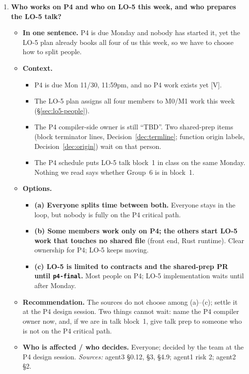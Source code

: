 \documentclass[10pt]{article}
\newcommand{\code}[1]{\texttt{\small #1}}
\newcommand{\mV}{\textsf{\scriptsize[V]}}
\newcommand{\field}[1]{\textbf{#1}\enspace}
\newcommand{\decitem}[1]{\needspace{6\baselineskip}\setcounter{enumi}{\numexpr#1-1\relax}\item}
\begin{document}
\begin{enumerate}[label=\textbf{\arabic*.},ref=\arabic*,leftmargin=1.8em,itemsep=0.8em]

\decitem{3}\label{dec:staffing}\textbf{Who works on P4 and who on LO-5 this week, and who prepares the LO-5 talk?}
\begin{itemize}
\item[] \field{In one sentence.} P4 is due Monday and nobody has started it, yet the LO-5 plan already books all four of us this week, so we have to choose how to split people.
\item[] \field{Context.}
\begin{itemize}
\item P4 is due Mon 11/30, 11:59pm, and no P4 work exists yet \mV.
\item The LO-5 plan assigns all four members to M0/M1 work this week (\S\ref{sec:lo5-people}).
\item The P4 compiler-side owner is still ``TBD''. Two shared-prep items (block terminator lines, Decision~\ref{dec:termline}; function origin labels, Decision~\ref{dec:origin}) wait on that person.
\item The P4 schedule puts LO-5 talk block~1 in class on the same Monday. Nothing we read says whether Group~6 is in block~1.
\end{itemize}
\item[] \field{Options.}
\begin{itemize}
\item \textbf{(a) Everyone splits time between both.} Everyone stays in the loop, but nobody is fully on the P4 critical path.
\item \textbf{(b) Some members work only on P4; the others start LO-5 work that touches no shared file} (front end, Rust runtime). Clear ownership for P4; LO-5 keeps moving.
\item \textbf{(c) LO-5 is limited to contracts and the shared-prep PR until \code{p4-final}.} Most people on P4; LO-5 implementation waits until after Monday.
\end{itemize}
\item[] \field{Recommendation.} The sources do not choose among (a)--(c); settle it at the P4 design session. Two things cannot wait: name the P4 compiler owner now, and, if we are in talk block~1, give talk prep to someone who is not on the P4 critical path.
\item[] \field{Who is affected / who decides.} Everyone; decided by the team at the P4 design session. \emph{Sources:} agent3 §0.12, §3, §4.9; agent1 risk 2; agent2 §2.
\end{itemize}


\end{enumerate}
\end{document}
